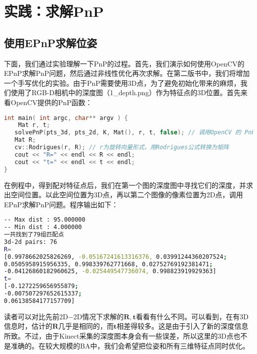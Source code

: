 \section{实践：求解PnP}
\subsection{使用EPnP求解位姿}
下面，我们通过实验理解一下PnP的过程。首先，我们演示如何使用OpenCV的EPnP求解PnP问题，然后通过非线性优化再次求解。在第二版书中，我们将增加一个手写优化的实验。由于PnP需要使用3D点，为了避免初始化带来的麻烦，我们使用了RGB-D相机中的深度图（1_depth.png）作为特征点的3D位置。首先来看OpenCV提供的PnP函数：

\begin{lstlisting}[language=c++,caption=slambook2/ch7/pose_estimation_3d2d.cpp（片段）]
int main( int argc, char** argv ) {
    Mat r, t;
   solvePnP(pts_3d, pts_2d, K, Mat(), r, t, false); // 调用OpenCV 的 PnP 求解，可选择EPNP，DLS等方法
   Mat R;
   cv::Rodrigues(r, R); // r为旋转向量形式，用Rodrigues公式转换为矩阵
   cout << "R=" << endl << R << endl;
   cout << "t=" << endl << t << endl;
}
\end{lstlisting}

在例程中，得到配对特征点后，我们在第一个图的深度图中寻找它们的深度，并求出空间位置。以此空间位置为3D点，再以第二个图像的像素位置为2D点，调用EPnP求解PnP问题。程序输出如下：

\begin{lstlisting}[language=sh,caption=终端输入：]
% build/pose_estimation_3d2d 1.png 2.png d1.png d2.png
-- Max dist : 95.000000 
-- Min dist : 4.000000 
一共找到了79组匹配点
3d-2d pairs: 76
R=
[0.9978662025826269, -0.05167241613316376, 0.03991244360207524;
0.0505958915956335, 0.998339762771668, 0.02752769192381471;
-0.04126860182960625, -0.025449547736074, 0.998823919929363]
t=
[-0.1272259656955879;
-0.007507297652615337;
0.06138584177157709]
\end{lstlisting}

读者可以对比先前2D−2D情况下求解的$\bm{R},\bm{t}$看看有什么不同。可以看到，在有3D信息时，估计的$\bm{R}$几乎是相同的，而$\bm{t}$相差得较多。这是由于引入了新的深度信息所致。不过，由于Kinect采集的深度图本身会有一些误差，所以这里的3D点也不是准确的。在较大规模的BA中，我们会希望把位姿和所有三维特征点同时优化。


